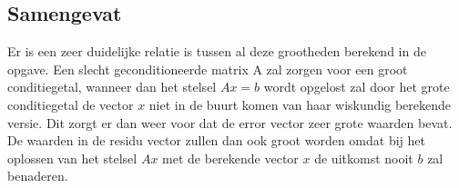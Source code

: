 \documentclass[10pt,a4paper,twocolumn]{article}
\begin{document}
\subsection{Samengevat}
Er is een zeer duidelijke relatie is tussen al deze grootheden berekend in de opgave. Een slecht geconditioneerde matrix A zal zorgen voor een groot conditiegetal, wanneer dan het stelsel $Ax = b$ wordt opgelost zal door het grote conditiegetal de vector $x$ niet in de buurt komen van haar wiskundig berekende versie. Dit zorgt er dan weer voor dat de error vector zeer grote waarden bevat. De waarden in de residu vector zullen dan ook groot worden omdat bij het oplossen van het stelsel $Ax$ met de berekende vector $x$ de uitkomst nooit $b$ zal benaderen.
\end{document}
